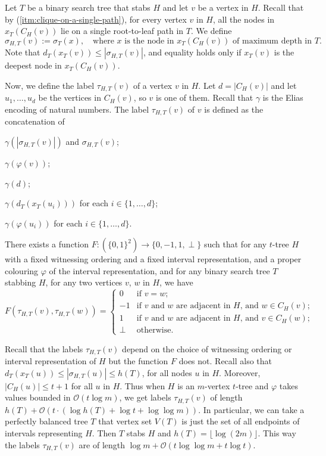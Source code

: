 \documentclass[kpfonts]{patmorin}
\newcommand{\Oh}{\mathcal{O}}
\let\le\leqslant
\let\leq\leqslant
\newcommand{\itemref}[1]{(\ref{#1})}
\begin{document}
Let $T$ be a binary search tree that stabs $H$ and let $v$ be a vertex in $H$. 
Recall that by \itemref{itm:clique-on-a-single-path}, 
for every vertex $v$ in $H$, 
all the nodes in $x_T(C_H(v))$ lie on a single root-to-leaf path in $T$. 
We define
\[
\sigma_{H,T}(v):=\sigma_T(x),\quad\text{where $x$ is the node in $x_T(C_H(v))$ of maximum depth in $T$.}
\]
Note that $d_T(x_T(v))\le |\sigma_{H,T}(v)|$, and equality holds only if $x_T(v)$ is the deepest node in $x_T(C_H(v))$.


Now, we define the label $\tau_{H,T}(v)$ of a vertex $v$ in $H$. 
Let $d=|C_H(v)|$ and let $u_1,\ldots, u_d$ be the vertices in $C_H(v)$, so $v$ is one of them. 
Recall that $\gamma$ is the Elias encoding of natural numbers.
The label $\tau_{H,T}(v)$ of $v$ is defined 
as the concatenation of
\begin{compactenum}[(T1)]
  \item $\gamma(|\sigma_{H,T}(v)|)$ and $\sigma_{H,T}(v)$;
  \item $\gamma(\varphi(v))$;
  \item $\gamma(d)$;
  \item $\gamma(d_{T}(x_T(u_i)))$ for each $i\in\{1,\ldots,d\}$;
  \item $\gamma(\varphi(u_i))$ for each $i\in\{1,\ldots,d\}$.
  \end{compactenum}

\begin{lem}
  There exists a function $F:(\{0,1\}^2)\to\{0,-1,1,\perp\}$ such that
  for any $t$-tree $H$ 
  with a fixed witnessing ordering and a fixed interval representation, 
  and a proper colouring $\varphi$ of the interval representation, and 
  for any binary search tree $T$ stabbing $H$,
  for any two vertices $v$, $w$ in $H$, we have
  \[
      F(\tau_{H,T}(v),\tau_{H,T}(w)) = \begin{cases}
      0 & \text{if $v=w$;} \\
      -1 & \text{if $v$ and $w$ are adjacent in $H$, and $w\in C_H(v)$;} \\
      1 & \text{if $v$ and $w$ are adjacent in $H$, and $v\in C_H(w)$;} \\
      \perp & \text{otherwise.}
    \end{cases}
  \]
\end{lem}
Recall that the labels $\tau_{H,T}(v)$ depend on the choice of witnessing ordering or interval representation of $H$ but the function $F$ does not.
Recall also that $d_T(x_T(u)) \le |\sigma_{H,T}(u)|\leq h(T)$, for all nodes $u$ in $H$. 
Moreover, $|C_H(u)|\leq t+1$ for all $u$ in $H$. 
Thus when $H$ is an $m$-vertex $t$-tree and $\varphi$ takes values bounded in $\Oh(t\log m)$, 
we get labels $\tau_{H,T}(v)$ of length
$h(T) + \Oh(t\cdot (\log h(T) + \log t + \log\log m))$.
In particular, we can take a perfectly balanced tree $T$ that vertex set $V(T)$ is just the set of all endpoints of intervals representing $H$.
Then $T$ stabs $H$ and $h(T)=\lfloor\log(2m)\rfloor$. 
This way the labels $\tau_{H,T}(v)$ are of length $\log m + \Oh(t\log\log m +t\log t)$.
\end{document}
